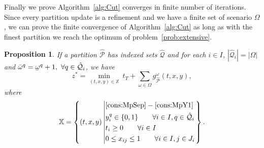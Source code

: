\documentclass[11pt]{article}
\newtheorem{proposition}[theorem]{Proposition}
\renewcommand{\underbar}{\underaccent{\bar}}
\begin{document}
	Finally we prove Algorithm~\ref{alg:Cut} converges in finite number of iterations. Since every partition update is a refinement and we have a finite set of scenario \(\Omega\), we can prove the finite convergence of Algorithm~\ref{alg:Cut} as long as with the finest partition we reach the optimum of problem~\eqref{prob:extensive}.
	\begin{proposition} \label{prop:finestPar}
		If a partition \(\hat{\mathcal{P}}\) has indexed sets \(\hat{\mathcal{Q}}\) and for each \(i \in I\), \(|\hat{\mathcal{Q}}_i| = |\Omega|\) and \(\bar{\omega}^q = \underbar{\omega}^q + 1,\ \forall q \in \hat{\mathcal{Q}}_i\), we have \[z^* = \min_{(t,x,y) \in \mathbb{X}}\ t_T + \sum_{\omega \in \Omega} g^\omega_{\hat{\mathcal{P}}}(t,x,y),\]
		where 
		\begin{equation*}
			\mathbb{X} = \left\{(t,x,y) \left| 
			\begin{aligned}
			& \eqref{cons:MpSep}-\eqref{cons:MpY1}\\ 
			&y_i^q \in \{0,1\} \qquad \forall i \in I, q \in \hat{\mathcal{Q}}_i\\
			& t_i \geq 0 \qquad \forall i \in I\\
			& 0 \leq x_{ij} \leq 1 \qquad \forall i \in I, j \in J_i
			\end{aligned}
			\right. \right\}.
		\end{equation*}
	\end{proposition}
\end{document}
